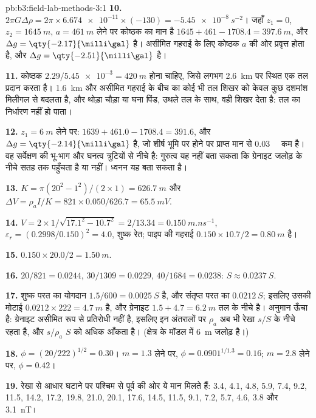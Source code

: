 \begin{solution}{pb:b3:field-lab-methods-3:1}
\textbf{10.} $2\pi G\Delta\rho = 2\pi\times\num{6.674e-11}\times(-130) =
\qty{-5.45e-8}{s^{-2}}$। जहाँ $z_1 = 0$, $z_2 = \qty{1645}{m}$, $a =
\qty{461}{m}$ लेने पर कोष्ठक का मान है $1645 + 461 - 1708.4 = \qty{397.6}{m}$,
और $\Delta g = \qty{-2.17}{\milli\gal}$ है। असीमित गहराई के लिए कोष्ठक
$a$ की ओर प्रवृत्त होता है, और $\Delta g = \qty{-2.51}{\milli\gal}$ है।

\textbf{11.} कोष्ठक $2.29/\num{5.45e-3} = \qty{420}{m}$ होना चाहिए, जिसे लगभग
\qty{2.6}{km} पर स्थित एक तल प्रदान करता है। \qty{1.6}{km} और असीमित गहराई के बीच का कोई भी तल
शिखर को केवल कुछ दशमांश मिलीगल से बदलता है,
और थोड़ा चौड़ा या घना पिंड, उथले तल के साथ, वही शिखर देता है:
तल का निर्धारण नहीं हो पाता।

\textbf{12.} $z_1 = \qty{6}{m}$ लेने पर: $1639 + 461.0 - 1708.4 = 391.6$, और
$\Delta g = \qty{-2.14}{\milli\gal}$ है, जो शीर्ष भूमि पर होने पर प्राप्त मान से
\qty{0.03}{\milli\gal} कम है। वह सर्वेक्षण की भू-भाग और घनत्व त्रुटियों से
नीचे है: गुरुत्व यह नहीं बता सकता कि ग्रेनाइट जलोढ़ के नीचे सतह तक पहुँचता है या नहीं।
ध्वनन यह बता सकता है।

\textbf{13.} $K = \pi(20^2 - 1^2)/(2\times1) = \qty{626.7}{m}$ और $\Delta V =
\rho_a I/K = 821\times0.050/626.7 = \qty{65.5}{mV}$.

\textbf{14.} $V = 2\times1/\sqrt{17.1^2 - 10.7^2} = 2/13.34 =
\qty{0.150}{m.ns^{-1}}$, $\varepsilon_r = (0.2998/0.150)^2 = 4.0$, शुष्क रेत;
पाइप की गहराई $0.150\times10.7/2 = \qty{0.80}{m}$ है।

\textbf{15.} $0.150\times20.0/2 = \qty{1.50}{m}$.

\textbf{16.} $20/821 = \num{0.0244}$, $30/1309 = \num{0.0229}$, $40/1684 =
\num{0.0238}$: $S \approx \qty{0.0237}{S}$.

\textbf{17.} शुष्क परत का योगदान $1.5/600 = \qty{0.0025}{S}$ है,
और संतृप्त परत का $\qty{0.0212}{S}$; इसलिए उसकी मोटाई $0.0212\times222 =
\qty{4.7}{m}$ है, और ग्रेनाइट $1.5 + 4.7 = \qty{6.2}{m}$
तल के नीचे है। अनुमान ऊँचा है: ग्रेनाइट असीमित रूप से
प्रतिरोधी नहीं है, इसलिए इन अंतरालों पर $\rho_a$ अब भी रेखा
$s/S$ के नीचे रहता है, और $s/\rho_a$ $S$ को अधिक आँकता है। (क्षेत्र के मॉडल में
\qty{6}{m} जलोढ़ है।)

\textbf{18.} $\phi = (20/222)^{1/2} = \num{0.30}$। $m = 1.3$ लेने पर, $\phi =
0.0901^{1/1.3} = \num{0.16}$; $m = 2.8$ लेने पर, $\phi = \num{0.42}$।

\textbf{19.} रेखा से आधार घटाने पर पश्चिम से पूर्व की ओर ये मान मिलते हैं:
3.4, 4.1, 4.8, 5.9, 7.4, 9.2, 11.5, 14.2, 17.2, 19.8, 21.0, 20.1, 17.6,
14.5, 11.5, 9.1, 7.2, 5.7, 4.6, 3.8 और \qty{3.1}{nT}।


\end{solution}
